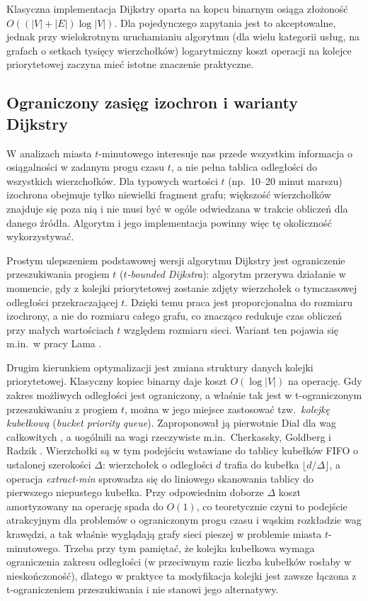 Klasyczna implementacja Dijkstry oparta na kopcu binarnym osiąga złożoność
$O((|V|+|E|)\log|V|)$. Dla pojedynczego zapytania jest to akceptowalne, jednak przy wielokrotnym
uruchamianiu algorytmu (dla wielu kategorii usług, na grafach o setkach tysięcy wierzchołków)
logarytmiczny koszt operacji na kolejce priorytetowej zaczyna mieć istotne znaczenie praktyczne.

\subsection{Ograniczony zasięg izochron i warianty Dijkstry}
\label{sec:intro:warianty-dijkstry}

W analizach miasta $t$-minutowego interesuje nas przede wszystkim informacja o osiągalności
w zadanym progu czasu $t$, a nie pełna tablica odległości do wszystkich wierzchołków.
Dla typowych wartości $t$ (np.\ 10--20 minut marszu) izochrona obejmuje tylko niewielki
fragment grafu; większość wierzchołków znajduje się poza nią i nie musi być w ogóle
odwiedzana w trakcie obliczeń dla danego źródła. Algorytm i jego implementacja powinny
więc tę okoliczność wykorzystywać.

Prostym ulepszeniem podstawowej wersji algorytmu Dijkstry jest ograniczenie przeszukiwania progiem $t$
(\emph{$t$-bounded Dijkstra}): algorytm przerywa działanie w momencie, gdy z kolejki priorytetowej
zostanie zdjęty wierzchołek o tymczasowej odległości przekraczającej $t$. Dzięki temu praca jest proporcjonalna
do rozmiaru izochrony, a nie do rozmiaru całego grafu, co znacząco redukuje czas obliczeń
przy małych wartościach $t$ względem rozmiaru sieci. Wariant ten pojawia się m.in.\ w pracy Lama \cite{Lam2024}.

Drugim kierunkiem optymalizacji jest zmiana struktury danych kolejki priorytetowej. Klasyczny
kopiec binarny daje koszt $O(\log |V|)$ na operację. Gdy zakres możliwych odległości jest
ograniczony, a właśnie tak jest w t-ograniczonym przeszukiwaniu z progiem $t$, można w jego
miejsce zastosować tzw.\ \emph{kolejkę kubełkową} (\emph{bucket priority queue}). Zaproponował
ją pierwotnie Dial dla wag całkowitych \cite{dial1969}, a uogólnili na wagi rzeczywiste
m.in.\ Cherkassky, Goldberg i Radzik \cite{cherkassky1996}. Wierzchołki są w tym podejściu
wstawiane do tablicy kubełków FIFO o ustalonej szerokości $\Delta$: wierzchołek o odległości $d$
trafia do kubełka $\lfloor d/\Delta\rfloor$, a operacja \emph{extract-min} sprowadza się do
liniowego skanowania tablicy do pierwszego niepustego kubełka. Przy odpowiednim doborze $\Delta$
koszt amortyzowany na operację spada do $O(1)$, co teoretycznie czyni to podejście atrakcyjnym
dla problemów o ograniczonym progu czasu i wąskim rozkładzie wag krawędzi, a tak właśnie
wyglądają grafy sieci pieszej w problemie miasta $t$-minutowego. Trzeba przy tym pamiętać,
że kolejka kubełkowa wymaga ograniczenia zakresu odległości (w przeciwnym razie liczba kubełków
rosłaby w nieskończoność), dlatego w praktyce ta modyfikacja kolejki jest zawsze łączona
z t-ograniczeniem przeszukiwania i nie stanowi jego alternatywy.

